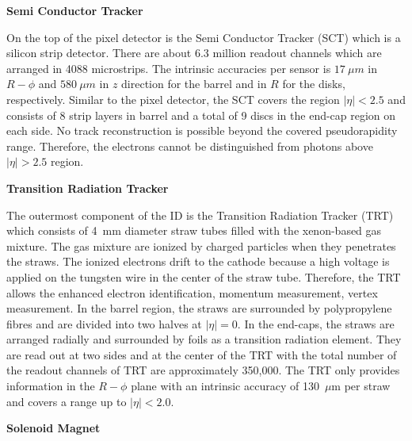 \noindent \textbf{Semi Conductor Tracker}

On the top of the pixel detector is the Semi Conductor Tracker (SCT) which is a silicon strip detector.
There are about 6.3 million readout channels which are arranged in 4088 microstrips.
The intrinsic accuracies per sensor is $17~\mu m$ in $R-\phi$ and $580~\mu m$ in $z$ direction for the barrel and in $R$ for the  disks, respectively.
Similar to the pixel detector, the SCT covers the region $|\eta| < 2.5$ and consists of 8 strip layers in barrel and a total of 9 discs in the end-cap region on each side.
No track reconstruction is possible beyond the covered pseudorapidity range.
Therefore, the electrons cannot be distinguished from photons above $|\eta| > 2.5$ region.

\noindent \textbf{Transition Radiation Tracker}

The outermost component of the ID is the Transition Radiation Tracker (TRT) which consists of 4~mm diameter straw tubes filled with the xenon-based gas mixture.
The gas mixture are ionized by charged particles when they penetrates the straws.
The ionized electrons drift to the cathode because a high voltage is applied on the tungsten wire in the center of the straw tube.
Therefore, the TRT allows the enhanced electron identification, momentum measurement, vertex measurement.
In the barrel region, the straws are surrounded by polypropylene fibres and are divided into two halves at $|\eta|=0$.
In the end-caps, the straws are arranged radially and surrounded by foils as a transition radiation element.
They are read out at two sides and at the center of the TRT with the total number of the readout channels of TRT are approximately 350,000.
The TRT only provides information in the $R-\phi$ plane with an intrinsic accuracy of 130~$\mu$m per straw and covers a range up to $|\eta| < 2.0$. 

\noindent \textbf{Solenoid Magnet}

